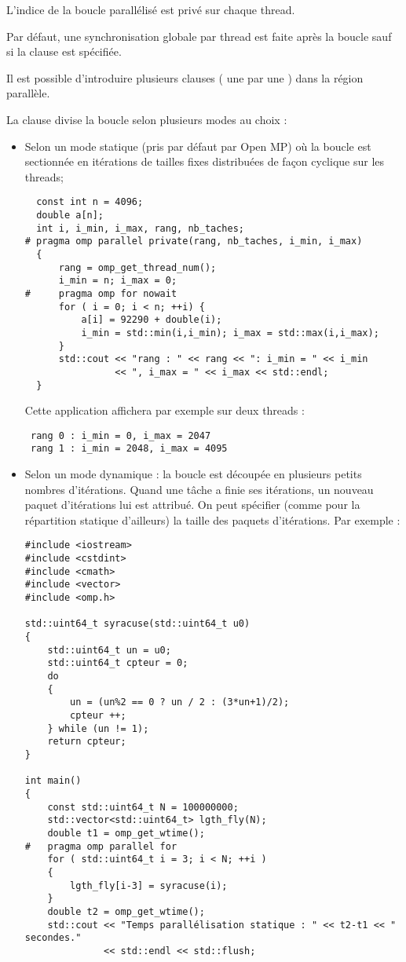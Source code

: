 \documentclass[fleqn,11pt]{article}
\begin{document}
L'indice de la boucle parallélisé est privé sur chaque thread.

Par défaut, une synchronisation globale par thread est faite après la boucle sauf si la clause \verb@nowait@
est spécifiée.

Il est possible d'introduire plusieurs clauses \verb@for@ ( une par une ) dans la région parallèle.

La clause \verb@schedule@ divise la boucle selon plusieurs modes au choix :

\begin{itemize}
 \item Selon un mode statique (pris par défaut par Open MP) où la boucle est sectionnée en itérations de tailles fixes distribuées de façon cyclique sur les threads;
 \begin{lstlisting}
  const int n = 4096;
  double a[n];
  int i, i_min, i_max, rang, nb_taches;
# pragma omp parallel private(rang, nb_taches, i_min, i_max)
  {
      rang = omp_get_thread_num();
      i_min = n; i_max = 0;
#     pragma omp for nowait
      for ( i = 0; i < n; ++i) {
          a[i] = 92290 + double(i);
          i_min = std::min(i,i_min); i_max = std::max(i,i_max);
      }
      std::cout << "rang : " << rang << ": i_min = " << i_min
                << ", i_max = " << i_max << std::endl;
  }
 \end{lstlisting}
 Cette application affichera par exemple sur deux threads :
 \begin{verbatim}
 rang 0 : i_min = 0, i_max = 2047
 rang 1 : i_min = 2048, i_max = 4095 
 \end{verbatim}

 \item Selon un mode dynamique : la boucle est découpée en plusieurs petits nombres d'itérations. Quand une tâche a finie ses itérations, un nouveau paquet d'itérations lui est attribué. On peut spécifier (comme pour
 la répartition statique d'ailleurs) la taille des paquets d'itérations.
 Par exemple :
\begin{lstlisting}
#include <iostream>
#include <cstdint>
#include <cmath>
#include <vector>
#include <omp.h>

std::uint64_t syracuse(std::uint64_t u0)
{
    std::uint64_t un = u0;
    std::uint64_t cpteur = 0;
    do
    {
        un = (un%2 == 0 ? un / 2 : (3*un+1)/2);
        cpteur ++;
    } while (un != 1);
    return cpteur;
}

int main()
{
    const std::uint64_t N = 100000000;
    std::vector<std::uint64_t> lgth_fly(N);
    double t1 = omp_get_wtime();
#   pragma omp parallel for
    for ( std::uint64_t i = 3; i < N; ++i )
    {
        lgth_fly[i-3] = syracuse(i);
    }
    double t2 = omp_get_wtime();
    std::cout << "Temps parallélisation statique : " << t2-t1 << " secondes."
              << std::endl << std::flush;


\end{lstlisting}
\end{itemize}
\end{document}
